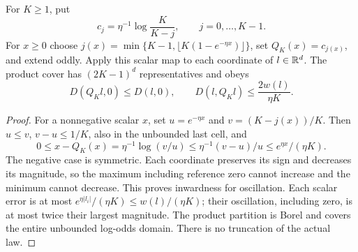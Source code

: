 \begin{lemma}\label{lem:compander}
For $K\ge1$, put
\begin{equation}\label{eq:compander}
 c_j=\eta^{-1}\log\frac K{K-j},\qquad j=0,\ldots,K-1.
\end{equation}
For $x\ge0$ choose $j(x)=\min\{K-1,\lfloor K(1-e^{-\eta x})\rfloor\}$, set $Q_K(x)=c_{j(x)}$, and extend oddly. Apply this scalar map to each coordinate of $l\in\mathbb R^d$. The product cover has $(2K-1)^d$ representatives and obeys
\begin{equation}\label{eq:compander-bound}
 D(Q_Kl,0)\le D(l,0),\qquad
 D(l,Q_Kl)\le\frac{2w(l)}{\eta K}.
\end{equation}
\end{lemma}
\begin{proof}
For a nonnegative scalar $x$, set $u=e^{-\eta x}$ and $v=(K-j(x))/K$. Then $u\le v$, $v-u\le1/K$, also in the unbounded last cell, and
\[
 0\le x-Q_K(x)=\eta^{-1}\log(v/u)
 \le\eta^{-1}(v-u)/u\le e^{\eta x}/(\eta K).
\]
The negative case is symmetric. Each coordinate preserves its sign and decreases its magnitude, so the maximum including reference zero cannot increase and the minimum cannot decrease. This proves inwardness for oscillation. Each scalar error is at most $e^{\eta|l_i|}/(\eta K)\le w(l)/(\eta K)$; their oscillation, including zero, is at most twice their largest magnitude. The product partition is Borel and covers the entire unbounded log-odds domain. There is no truncation of the actual law.
\end{proof}

